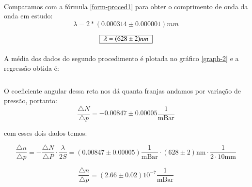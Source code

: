\documentclass[a4paper,11pt]{article}
\begin{document}
\paragraph{}Comparamos com a fórmula \ref{form-proced1} para obter o comprimento de onda da onda em estudo:
\begin{displaymath}
	\lambda = 2 * (0.000314 \pm 0.000001)mm  
\end{displaymath}

\begin{equation}
	\begin{tabular}{|c|}\hline
	$\lambda =  (628 \pm 2) nm$\\ \hline	
	\end{tabular}
\end{equation}



\paragraph{}A média dos dados do segundo procedimento é plotada no gráfico \ref{graph-2} e a regressão obtida é:

\begin{equation}
	
\end{equation}

O coeficiente angular dessa reta nos dá quanta franjas andamos por variação de pressão, portanto:
\begin{equation}
	\frac{\triangle N}{\triangle p} = - 0.00847 \pm 0.00005 \frac{1}{\mbox{mBar}}
\end{equation}

com esses dois dados temos:

\begin{displaymath}
	\frac{\triangle n }{\triangle p} = - \frac{\triangle N}{\triangle P} \cdot \frac{\lambda}{2S} = (0.00847 \pm 0.00005)\frac{1}{\mbox{mBar}} \cdot (628 \pm 2)\mbox{nm} \cdot \frac{1}{2 \cdot 10 \mbox{mm}}
\end{displaymath}

\begin{equation}
	\frac{\triangle n }{\triangle p} = (2.66 \pm  0.02)10^{-7} \frac{1}{\mbox{mBar}} 
	\label{coeff}
\end{equation}
\end{document}
